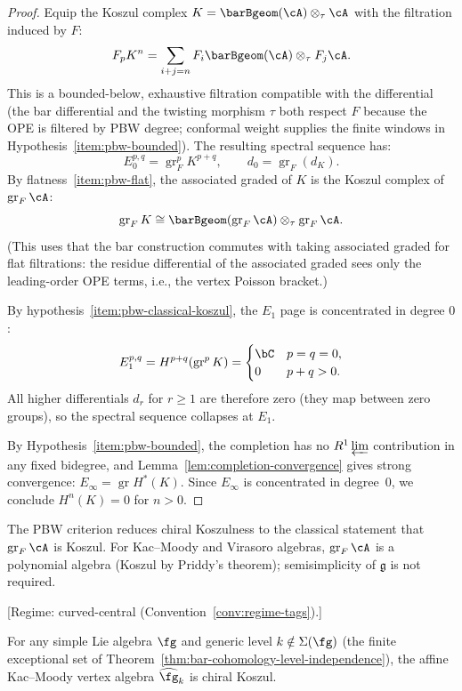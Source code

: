 \begin{proof}
Equip the Koszul complex $K = \barBgeom(\cA) \otimes_\tau \cA$ with
the filtration induced by $F$:
\[
F_p K^n = \sum_{i+j = n} F_i \barBgeom(\cA) \otimes_\tau F_j \cA.
\]
This is a bounded-below, exhaustive filtration compatible with the
differential (the bar differential and the twisting morphism $\tau$
both respect $F$ because the OPE is filtered by PBW degree; conformal
weight supplies the finite windows in
Hypothesis~\ref{item:pbw-bounded}). The resulting spectral sequence has:
\[
E_0^{p,q} = \operatorname{gr}^p_F K^{p+q},
\qquad
d_0 = \operatorname{gr}_F(d_K).
\]
By flatness~\ref{item:pbw-flat}, the associated graded of $K$ is
the Koszul complex of $\operatorname{gr}_F \cA$:
\[
\operatorname{gr}_F K \cong
\barBgeom(\operatorname{gr}_F \cA) \otimes_\tau \operatorname{gr}_F \cA.
\]
(This uses that the bar construction commutes with taking associated
graded for flat filtrations: the residue differential of the associated
graded sees only the leading-order OPE terms, i.e., the vertex Poisson
bracket.)

By hypothesis~\ref{item:pbw-classical-koszul}, the $E_1$ page
is concentrated in degree $0$:
\[
E_1^{p,q} = H^{p+q}(\operatorname{gr}^p K) =
\begin{cases}
\bC & p = q = 0, \\
0 & p + q > 0.
\end{cases}
\]
All higher differentials $d_r$ for $r \geq 1$ are therefore zero
(they map between zero groups), so the spectral sequence collapses
at $E_1$.

By Hypothesis~\ref{item:pbw-bounded}, the completion has no
$R^1\varprojlim$ contribution in any fixed bidegree, and
Lemma~\ref{lem:completion-convergence} gives strong convergence:
$E_\infty = \operatorname{gr} H^*(K)$.
Since $E_\infty$ is concentrated in degree~$0$,
we conclude $H^n(K) = 0$ for $n > 0$.
\end{proof}

\begin{remark}
\label{rem:classical-to-chiral-koszul}
The PBW criterion reduces chiral Koszulness to the classical statement that $\operatorname{gr}_F \cA$ is Koszul.
For Kac--Moody and Virasoro algebras, $\operatorname{gr}_F \cA$ is a polynomial algebra (Koszul by Priddy's theorem); semisimplicity of $\mathfrak{g}$ is not required.
\end{remark}

\begin{theorem}
\label{thm:km-chiral-koszul}
\textup{[Regime: curved-central
\textup{(}Convention~\textup{\ref{conv:regime-tags})}.]}

For any simple Lie algebra $\fg$ and generic level
$k \notin \Sigma(\fg)$ (the finite exceptional set of
Theorem~\textup{\ref{thm:bar-cohomology-level-independence}}),
the affine Kac--Moody vertex algebra
$\widehat{\fg}_k$ is chiral Koszul.
\end{theorem}

